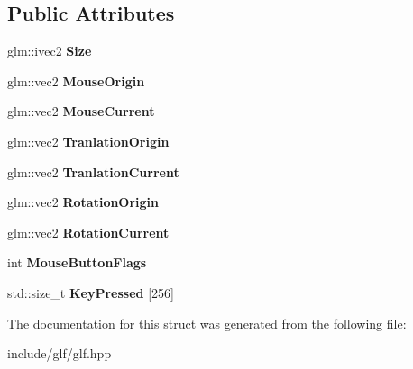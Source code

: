 \subsection*{Public Attributes}
\begin{DoxyCompactItemize}
\item 
\hypertarget{structglf_1_1window_a3ccf3073c5ee3ad7898a3df5e38e9e3c}{glm\-::ivec2 {\bfseries Size}}\label{structglf_1_1window_a3ccf3073c5ee3ad7898a3df5e38e9e3c}

\item 
\hypertarget{structglf_1_1window_af3e812025769b6fd906218f738c9830b}{glm\-::vec2 {\bfseries Mouse\-Origin}}\label{structglf_1_1window_af3e812025769b6fd906218f738c9830b}

\item 
\hypertarget{structglf_1_1window_a9c8c360ae5c63b5a497af107cc9bc26d}{glm\-::vec2 {\bfseries Mouse\-Current}}\label{structglf_1_1window_a9c8c360ae5c63b5a497af107cc9bc26d}

\item 
\hypertarget{structglf_1_1window_ac70f5217e610eac03bcf3520a7967684}{glm\-::vec2 {\bfseries Tranlation\-Origin}}\label{structglf_1_1window_ac70f5217e610eac03bcf3520a7967684}

\item 
\hypertarget{structglf_1_1window_a36a4ed3b03f6f6a763a9aad5144395a9}{glm\-::vec2 {\bfseries Tranlation\-Current}}\label{structglf_1_1window_a36a4ed3b03f6f6a763a9aad5144395a9}

\item 
\hypertarget{structglf_1_1window_ab463ee2990a13091537839b9f27e5eb6}{glm\-::vec2 {\bfseries Rotation\-Origin}}\label{structglf_1_1window_ab463ee2990a13091537839b9f27e5eb6}

\item 
\hypertarget{structglf_1_1window_adbb0959aec4c8d87fd0c6cfa5f448c1c}{glm\-::vec2 {\bfseries Rotation\-Current}}\label{structglf_1_1window_adbb0959aec4c8d87fd0c6cfa5f448c1c}

\item 
\hypertarget{structglf_1_1window_a65ff6fd7005591df0281d714eae5a8b9}{int {\bfseries Mouse\-Button\-Flags}}\label{structglf_1_1window_a65ff6fd7005591df0281d714eae5a8b9}

\item 
\hypertarget{structglf_1_1window_a34c61f5ba8070359924713e45f80396f}{std\-::size\-\_\-t {\bfseries Key\-Pressed} \mbox{[}256\mbox{]}}\label{structglf_1_1window_a34c61f5ba8070359924713e45f80396f}

\end{DoxyCompactItemize}


The documentation for this struct was generated from the following file\-:\begin{DoxyCompactItemize}
\item 
include/glf/glf.\-hpp\end{DoxyCompactItemize}
